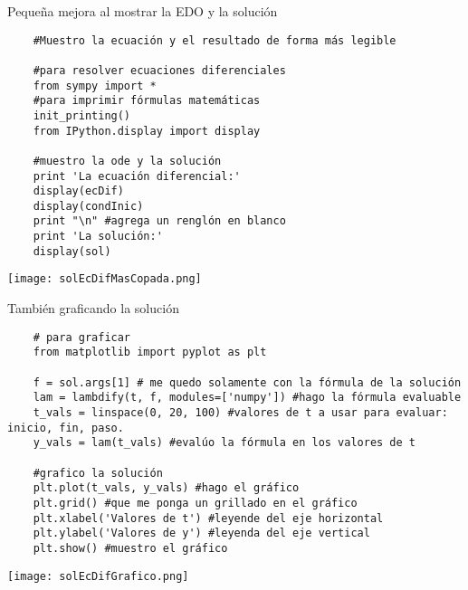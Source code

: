 \documentclass{beamer}
\begin{document}
\begin{frame}[fragile]{Pequeña mejora al mostrar la EDO y la solución}
\scriptsize{\begin{verbatim}	
	#Muestro la ecuación y el resultado de forma más legible
	
	#para resolver ecuaciones diferenciales
	from sympy import *
	#para imprimir fórmulas matemáticas
	init_printing() 
	from IPython.display import display 
	
	#muestro la ode y la solución
	print 'La ecuación diferencial:'
	display(ecDif)
	display(condInic)
	print "\n" #agrega un renglón en blanco
	print 'La solución:'
	display(sol)
\end{verbatim}}
\texttt{[image: solEcDifMasCopada.png]}

\end{frame}



\begin{frame}[fragile]{También graficando la solución}
\scriptsize{\begin{verbatim}	
	# para graficar
	from matplotlib import pyplot as plt
	
	f = sol.args[1] # me quedo solamente con la fórmula de la solución
	lam = lambdify(t, f, modules=['numpy']) #hago la fórmula evaluable
	t_vals = linspace(0, 20, 100) #valores de t a usar para evaluar: inicio, fin, paso.
	y_vals = lam(t_vals) #evalúo la fórmula en los valores de t
	
	#grafico la solución
	plt.plot(t_vals, y_vals) #hago el gráfico
	plt.grid() #que me ponga un grillado en el gráfico
	plt.xlabel('Valores de t') #leyende del eje horizontal
	plt.ylabel('Valores de y') #leyenda del eje vertical
	plt.show() #muestro el gráfico
	\end{verbatim}}
\texttt{[image: solEcDifGrafico.png]}
\end{frame}
\end{document}
